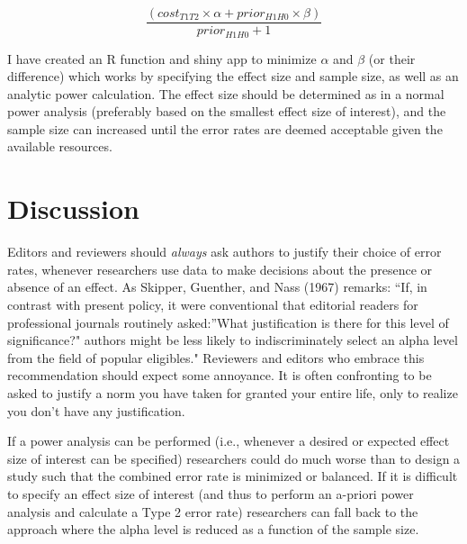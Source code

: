 \documentclass[,jou,floatsintext]{apa6}
\begin{document}
\begin{equation}
\frac{(cost_{T1T2} \times \alpha + prior_{H1H0} \times \beta)}{prior_{H1H0}+1}
\label{eq:minimize}
\end{equation}

I have created an R function and shiny app to minimize \(\alpha\) and \(\beta\) (or their difference) which works by specifying the effect size and sample size, as well as an analytic power calculation. The effect size should be determined as in a normal power analysis (preferably based on the smallest effect size of interest), and the sample size can increased until the error rates are deemed acceptable given the available resources.

\hypertarget{discussion}{%
\section{Discussion}\label{discussion}}

Editors and reviewers should \emph{always} ask authors to justify their choice of error rates, whenever researchers use data to make decisions about the presence or absence of an effect. As Skipper, Guenther, and Nass (1967) remarks: \enquote{If, in contrast with present policy, it were conventional that editorial readers for professional journals routinely asked:}What justification is there for this level of significance?" authors might be less likely to indiscriminately select an alpha level from the field of popular eligibles." Reviewers and editors who embrace this recommendation should expect some annoyance. It is often confronting to be asked to justify a norm you have taken for granted your entire life, only to realize you don't have any justification.

If a power analysis can be performed (i.e., whenever a desired or expected effect size of interest can be specified) researchers could do much worse than to design a study such that the combined error rate is minimized or balanced. If it is difficult to specify an effect size of interest (and thus to perform an a-priori power analysis and calculate a Type 2 error rate) researchers can fall back to the approach where the alpha level is reduced as a function of the sample size.
\end{document}
